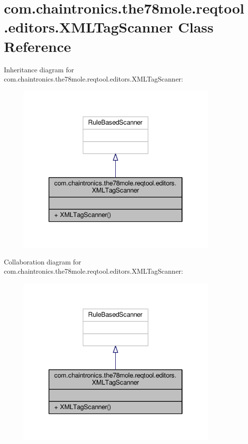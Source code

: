 \hypertarget{classcom_1_1chaintronics_1_1the78mole_1_1reqtool_1_1editors_1_1XMLTagScanner}{}\section{com.\+chaintronics.\+the78mole.\+reqtool.\+editors.\+X\+M\+L\+Tag\+Scanner Class Reference}
\label{classcom_1_1chaintronics_1_1the78mole_1_1reqtool_1_1editors_1_1XMLTagScanner}


Inheritance diagram for com.\+chaintronics.\+the78mole.\+reqtool.\+editors.\+X\+M\+L\+Tag\+Scanner\+:\nopagebreak
\begin{figure}[H]
\begin{center}
\leavevmode
\includegraphics[width=286pt]{d2/da8/classcom_1_1chaintronics_1_1the78mole_1_1reqtool_1_1editors_1_1XMLTagScanner__inherit__graph}
\end{center}
\end{figure}


Collaboration diagram for com.\+chaintronics.\+the78mole.\+reqtool.\+editors.\+X\+M\+L\+Tag\+Scanner\+:\nopagebreak
\begin{figure}[H]
\begin{center}
\leavevmode
\includegraphics[width=286pt]{dd/d1b/classcom_1_1chaintronics_1_1the78mole_1_1reqtool_1_1editors_1_1XMLTagScanner__coll__graph}
\end{center}
\end{figure}

